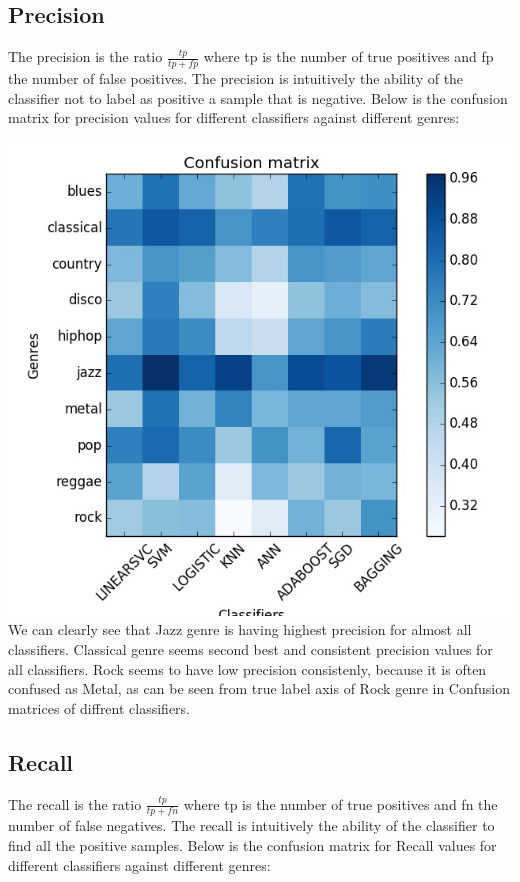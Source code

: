 \documentclass[conference]{IEEEtran}
\begin{document}
\subsection{Precision}
The precision is the ratio $\frac{tp}{tp + fp}$ where tp is the number of true positives and fp the number of false positives. The precision is intuitively the ability of the classifier not to label as positive a sample that is negative.
Below is the confusion matrix for precision values for different classifiers against different genres:

\includegraphics[width=\columnwidth]{precision}
We can clearly see that Jazz genre is having highest precision for almost all classifiers. Classical genre seems second best and consistent precision values for all classifiers. Rock seems to have low precision consistenly, because it is often confused as Metal, as can be seen from true label axis of Rock genre in Confusion matrices of diffrent classifiers.
\subsection{Recall}
The recall is the ratio $\frac{tp}{tp + fn}$ where tp is the number of true positives and fn the number of false negatives. The recall is intuitively the ability of the classifier to find all the positive samples.
Below is the confusion matrix for Recall values for different classifiers against different genres:
\end{document}
